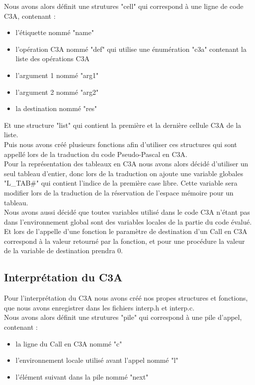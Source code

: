 \documentclass{report}
\begin{document}
Nous avons alors définit une strutures "cell" qui correspond à une ligne de code C3A, contenant :
\begin{itemize}
\item l'étiquette nommé "name"
\item l'opération C3A nommé "def" qui utilise une énumération "c3a" contenant la liste des opérations C3A
\item l'argument 1 nommé "arg1"
\item l'argument 2 nommé "arg2"
\item la destination nommé "res"
\end{itemize}
\bigskip

Et une structure "list" qui contient la première et la dernière cellule C3A de la liste.\\

Puis nous avons créé plusieurs fonctions afin d'utiliser ces structures qui sont appellé lors de la traduction du code Pseudo-Pascal en C3A.\\

Pour la représentation des tableaux en C3A nous avons alors décidé d'utiliser un seul tableau d'entier, donc lors de la traduction on ajoute une variable globales "L\_TAB\#" qui contient l'indice de la première case libre. Cette variable sera modifier lors de la traduction de la réservation de l'espace mémoire pour un tableau.\\

Nous avons aussi décidé que toutes variables utilisé dans le code C3A n'étant pas dans l'environnement global sont des variables locales de la partie du code évalué.\\

Et lors de l'appelle d'une fonction le paramètre de destination d'un Call en C3A correspond à la valeur retourné par la fonction, et pour une procédure la valeur de la variable de destination prendra 0.

\subsection{Interprétation du C3A}
Pour l'interprétation du C3A nous avons créé nos propes structures et fonctions, que nous avons enregistrer dans les fichiers interp.h et interp.c.\\

Nous avons alors définit une strutures "pile" qui correspond à une pile d'appel, contenant :
\begin{itemize}
\item la ligne du Call en C3A nommé "c"
\item l'environnement locale utilisé avant l'appel nommé "l"
\item l'élément suivant dans la pile nommé "next"
\end{itemize}
\bigskip
\end{document}
